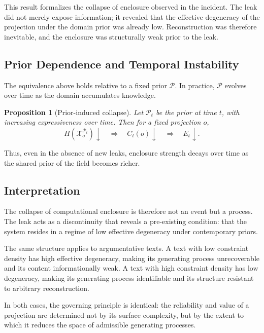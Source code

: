 \documentclass[12pt, oneside]{article}
\theoremstyle{plain}
\newtheorem{proposition}[theorem]{Proposition}
\theoremstyle{definition}
\theoremstyle{remark}
\newcommand{\config}{\mathcal{X}}
\newcommand{\prior}{\mathcal{P}}
\begin{document}
This result formalizes the collapse of enclosure observed in the incident. The leak
did not merely expose information; it revealed that the effective degeneracy of the
projection under the domain prior was already low. Reconstruction was therefore
inevitable, and the enclosure was structurally weak prior to the leak.

\subsection{Prior Dependence and Temporal Instability}

The equivalence above holds relative to a fixed prior $\prior$. In practice, $\prior$
evolves over time as the domain accumulates knowledge.

\begin{proposition}[Prior-induced collapse]
Let $\prior_t$ be the prior at time $t$, with increasing expressiveness over time.
Then for a fixed projection $o$,
\[
  H(\config_o^{\prior_t}) \downarrow \quad \Rightarrow \quad C_t(o) \downarrow \quad \Rightarrow \quad E_t \downarrow.
\]
\end{proposition}

Thus, even in the absence of new leaks, enclosure strength decays over time as the
shared prior of the field becomes richer.

\subsection{Interpretation}

The collapse of computational enclosure is therefore not an event but a process. The
leak acts as a discontinuity that reveals a pre-existing condition: that the system
resides in a regime of low effective degeneracy under contemporary priors.

The same structure applies to argumentative texts. A text with low constraint density
has high effective degeneracy, making its generating process unrecoverable and its
content informationally weak. A text with high constraint density has low degeneracy,
making its generating process identifiable and its structure resistant to arbitrary
reconstruction.

In both cases, the governing principle is identical: the reliability and value of a
projection are determined not by its surface complexity, but by the extent to which
it reduces the space of admissible generating processes.

\end{document}
